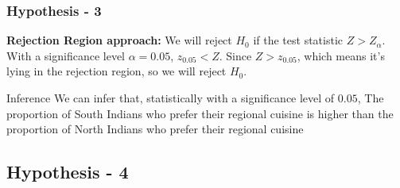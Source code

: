 \documentclass{beamer}
\begin{document}
\begin{frame}
    \frametitle{Hypothesis - 3}
    \textbf{Rejection Region approach:}
We will reject $H_0$ if the test statistic $Z > Z_{\alpha}$.
With a significance level $\alpha = 0.05$, $z_{0.05} < Z$.
Since $Z > z_{0.05}$, which means it's lying in the rejection region, so we will reject $H_0$.

\begin{block}{Inference} We can infer that, statistically with a significance level of $0.05$,  The proportion of South Indians who prefer their regional cuisine is higher than the proportion of North Indians who prefer their regional cuisine
 \end{block}

    
\end{frame}
\subsection{Hypothesis - 4}
\end{document}
